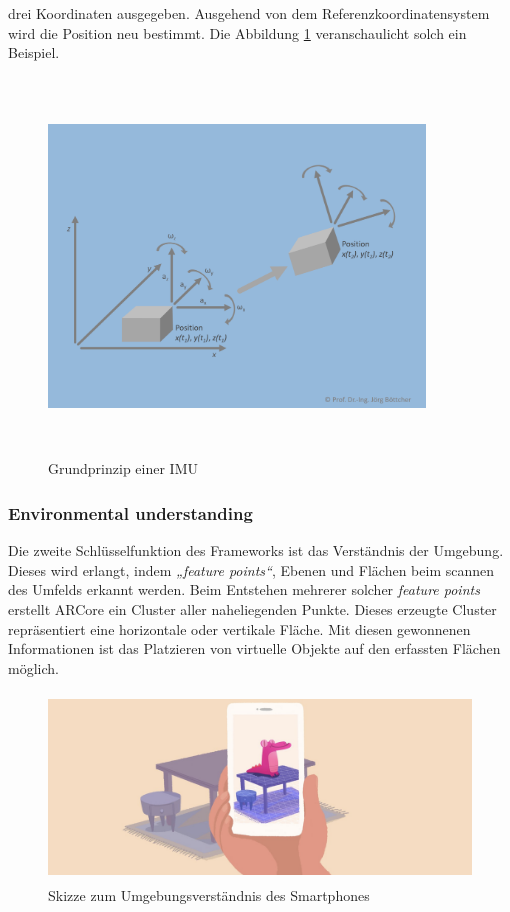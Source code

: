 drei Koordinaten ausgegeben. Ausgehend von dem Referenzkoordinatensystem wird die Position neu bestimmt. Die Abbildung \ref{pic:Positionsberechnung} 
veranschaulicht solch ein Beispiel.
\begin{figure}[hbt!]
    \centering
    \includegraphics[width=10cm,height=10cm,keepaspectratio]{2Grundlagen/Bilder/imu-Bsp.png}
    \caption{Grundprinzip einer IMU \cite{imubild.2020j}}
    \label{pic:Positionsberechnung}
\end{figure}
\subsubsection*{Environmental understanding}
Die zweite Schlüsselfunktion des Frameworks ist das Verständnis der Umgebung. Dieses wird erlangt, indem \textit{„feature points“}, Ebenen und 
Flächen beim scannen des Umfelds erkannt werden. Beim Entstehen mehrerer solcher \textit{feature points} erstellt ARCore ein Cluster aller 
naheliegenden Punkte. Dieses erzeugte Cluster repräsentiert eine horizontale oder vertikale Fläche. Mit diesen gewonnenen Informationen ist das 
Platzieren von virtuelle Objekte auf den erfassten Flächen möglich.
\begin{figure}[hbt!]
    \centering
    \includegraphics[width=15cm,height=5cm,keepaspectratio]{2Grundlagen/Bilder/environmentalUnderst.png}
    \caption{Skizze zum Umgebungsverständnis des Smartphones \cite{arcoreofficial.2020j}}
    \label{pic:environmentalunderst}
\end{figure}

